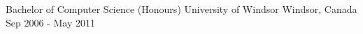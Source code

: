 \textcolor{awesome}{\raisebox{0.1\height}{\faGraduationCap\thinspace}}


\begin{cventries}

  \cventry
    {Bachelor of Computer Science (Honours)} %
    {University of Windsor} %
    {Windsor, Canada} %
    {Sep 2006 - May 2011} %
    {}

\end{cventries}
